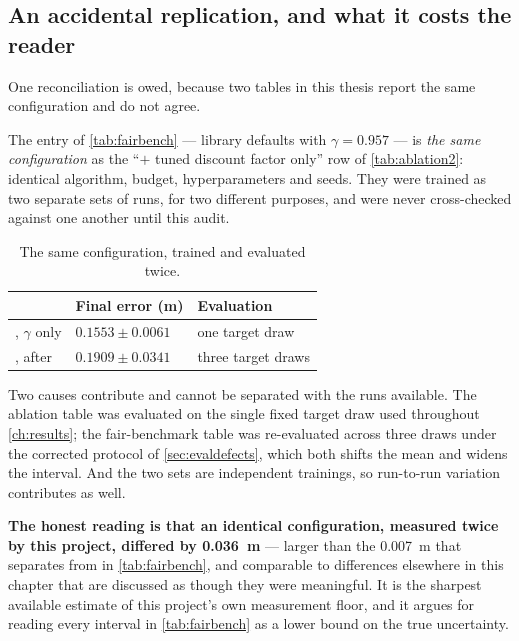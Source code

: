 \subsection{An accidental replication, and what it costs the reader}
\label{sec:accidental}

One reconciliation is owed, because two tables in this thesis report the same
configuration and do not agree.

The \SAC{} entry of \cref{tab:fairbench} --- library defaults with
$\gamma = 0.957$ --- is \emph{the same configuration} as the
``$+$ tuned discount factor only'' row of \cref{tab:ablation2}: identical
algorithm, budget, hyperparameters and seeds. They were trained as two separate
sets of runs, for two different purposes, and were never cross-checked against
one another until this audit.

\begin{table}[H]
\centering
\caption{The same configuration, trained and evaluated twice.}
\begin{tabular}{@{} L{5.4cm} C{3.4cm} C{3.6cm} @{}}
\toprule
& \textbf{Final error (m)} & \textbf{Evaluation} \\
\midrule
{}, $\gamma$ only & $0.1553 \pm 0.0061$ & one target draw \\
, \SAC{} after  & $0.1909 \pm 0.0341$ & three target draws \\
\bottomrule
\end{tabular}
\label{tab:accidental}
\end{table}

Two causes contribute and cannot be separated with the runs available. The
ablation table was evaluated on the single fixed target draw used throughout
\cref{ch:results}; the fair-benchmark table was re-evaluated across three draws
under the corrected protocol of \cref{sec:evaldefects}, which both shifts the
mean and widens the interval. And the two sets are independent trainings, so
run-to-run variation contributes as well.

\textbf{The honest reading is that an identical configuration, measured twice by
this project, differed by \SI{0.036}{\meter}} --- larger than the
\SI{0.007}{\meter} that separates \DDPG{} from \TDIII{} in
\cref{tab:fairbench}, and comparable to differences elsewhere in this chapter
that are discussed as though they were meaningful. It is the sharpest available
estimate of this project's own measurement floor, and it argues for reading every
interval in \cref{tab:fairbench} as a lower bound on the true uncertainty.

